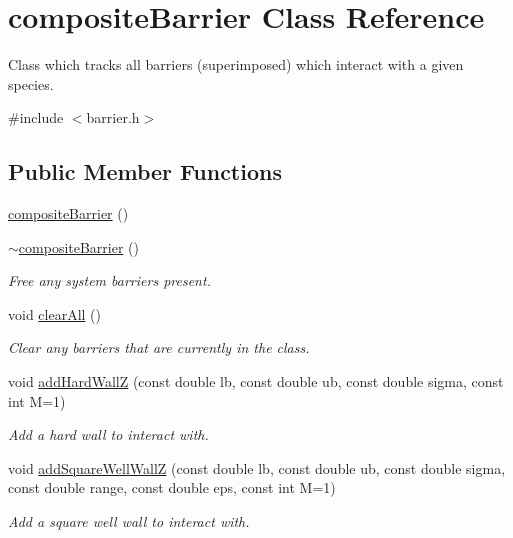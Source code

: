 \hypertarget{classcomposite_barrier}{\section{composite\-Barrier Class Reference}
\label{classcomposite_barrier}
}


Class which tracks all barriers (superimposed) which interact with a given species.  




{\ttfamily \#include $<$barrier.\-h$>$}

\subsection*{Public Member Functions}
\begin{DoxyCompactItemize}
\item 
\hyperlink{classcomposite_barrier_a84b553543dddd5177980f5e5a5616af3}{composite\-Barrier} ()
\item 
\hyperlink{classcomposite_barrier_a1362afbee9253343a95734b10953ccee}{$\sim$composite\-Barrier} ()
\begin{DoxyCompactList}\small\item\em Free any system barriers present. \end{DoxyCompactList}\item 
void \hyperlink{classcomposite_barrier_a9b40ae6dd65d5f92d8dc8b63301e14f6}{clear\-All} ()
\begin{DoxyCompactList}\small\item\em Clear any barriers that are currently in the class. \end{DoxyCompactList}\item 
void \hyperlink{classcomposite_barrier_a10e7f2561e3b5167b69ead011dde2e75}{add\-Hard\-Wall\-Z} (const double lb, const double ub, const double sigma, const int M=1)
\begin{DoxyCompactList}\small\item\em Add a hard wall to interact with. \end{DoxyCompactList}\item 
void \hyperlink{classcomposite_barrier_a3cb5df17c75d9ff8ccc44b806871b449}{add\-Square\-Well\-Wall\-Z} (const double lb, const double ub, const double sigma, const double range, const double eps, const int M=1)
\begin{DoxyCompactList}\small\item\em Add a square well wall to interact with. \end{DoxyCompactList}\item 

\end{DoxyCompactItemize}
